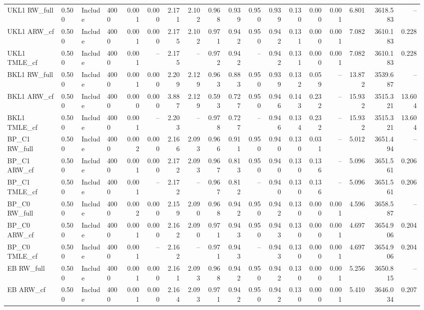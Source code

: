 \begin{tabular}{llllrrrrrrrrrrrrrr}
UKL1 RW\_full & 0.500 & Include & 4000 & 0.001 & 0.000 & 2.171 & 2.102 & 0.968 & 0.939 & 0.950 & 0.939 & 0.130 & 0.000 & 0.001 & 6.801 & 3618.583 & -- \\
UKL1 ARW\_cf & 0.500 & Include & 4000 & 0.001 & 0.000 & 2.175 & 2.102 & 0.971 & 0.942 & 0.950 & 0.942 & 0.131 & 0.000 & 0.001 & 7.082 & 3610.183 & 0.228 \\
UKL1 TMLE\_cf & 0.500 & Include & 4000 & 0.001 & -- & 2.175 & -- & 0.972 & 0.942 & -- & 0.942 & 0.131 & 0.000 & 0.001 & 7.082 & 3610.183 & 0.228 \\
BKL1 RW\_full & 0.500 & Include & 4000 & 0.001 & 0.000 & 2.209 & 2.129 & 0.963 & 0.883 & 0.950 & 0.939 & 0.132 & 0.059 & -- & 13.872 & 3539.687 & -- \\
BKL1 ARW\_cf & 0.500 & Include & 4000 & 0.000 & 0.000 & 3.887 & 2.129 & 0.593 & 0.727 & 0.950 & 0.946 & 0.143 & 0.232 & -- & 15.932 & 3515.321 & 13.604 \\
BKL1 TMLE\_cf & 0.500 & Include & 4000 & 0.001 & -- & 2.203 & -- & 0.978 & 0.727 & -- & 0.946 & 0.134 & 0.232 & -- & 15.932 & 3515.321 & 13.604 \\
BP\_C1 RW\_full & 0.500 & Include & 4000 & 0.002 & 0.000 & 2.166 & 2.093 & 0.966 & 0.911 & 0.950 & 0.940 & 0.130 & 0.031 & -- & 5.012 & 3651.494 & -- \\
BP\_C1 ARW\_cf & 0.500 & Include & 4000 & 0.001 & 0.000 & 2.172 & 2.093 & 0.967 & 0.813 & 0.950 & 0.940 & 0.130 & 0.136 & -- & 5.096 & 3651.561 & 0.206 \\
BP\_C1 TMLE\_cf & 0.500 & Include & 4000 & 0.001 & -- & 2.172 & -- & 0.967 & 0.812 & -- & 0.940 & 0.130 & 0.136 & -- & 5.096 & 3651.561 & 0.206 \\
BP\_C0 RW\_full & 0.500 & Include & 4000 & 0.002 & 0.000 & 2.159 & 2.090 & 0.968 & 0.942 & 0.950 & 0.942 & 0.130 & 0.000 & 0.001 & 4.596 & 3658.587 & -- \\
BP\_C0 ARW\_cf & 0.500 & Include & 4000 & 0.001 & 0.000 & 2.162 & 2.090 & 0.971 & 0.943 & 0.950 & 0.943 & 0.130 & 0.000 & 0.001 & 4.697 & 3654.906 & 0.204 \\
BP\_C0 TMLE\_cf & 0.500 & Include & 4000 & 0.001 & -- & 2.162 & -- & 0.971 & 0.943 & -- & 0.943 & 0.130 & 0.000 & 0.001 & 4.697 & 3654.906 & 0.204 \\
EB RW\_full & 0.500 & Include & 4000 & 0.001 & 0.000 & 2.161 & 2.093 & 0.968 & 0.942 & 0.950 & 0.942 & 0.130 & 0.000 & 0.001 & 5.256 & 3650.815 & -- \\
EB ARW\_cf & 0.500 & Include & 4000 & 0.001 & 0.000 & 2.164 & 2.093 & 0.971 & 0.942 & 0.950 & 0.942 & 0.130 & 0.000 & 0.001 & 5.410 & 3646.034 & 0.207 \\

\end{tabular}
